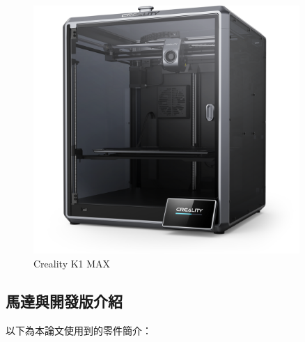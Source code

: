 \documentclass[class=NCU_thesis, crop=false]{standalone}
\begin{document}
\begin{figure}[htbp]
    \centering
    \includegraphics[width=0.9\textwidth]{figures/creality-k1-max.png}
\caption{Creality K1 MAX}
\end{figure}

\subsection{馬達與開發版介紹}
以下為本論文使用到的零件簡介：
\end{document}
